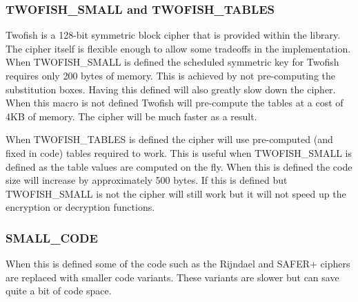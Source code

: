 \documentclass[b5paper]{book}
\begin{document}
\subsubsection{TWOFISH\_SMALL and TWOFISH\_TABLES}
Twofish is a 128-bit symmetric block cipher that is provided within the library.  The cipher itself is flexible enough
to allow some tradeoffs in the implementation.  When TWOFISH\_SMALL is defined the scheduled symmetric key for Twofish 
requires only 200 bytes of memory.  This is achieved by not pre-computing the substitution boxes.  Having this 
defined will also greatly slow down the cipher.  When this macro is not defined Twofish will pre-compute the 
tables at a cost of 4KB of memory.  The cipher will be much faster as a result.  

When TWOFISH\_TABLES is defined the cipher will use pre-computed (and fixed in code) tables required to work.  This is
useful when TWOFISH\_SMALL is defined as the table values are computed on the fly.  When this is defined the code size
will increase by approximately 500 bytes.  If this is defined but TWOFISH\_SMALL is not the cipher will still work but
it will not speed up the encryption or decryption functions.

\subsubsection{SMALL\_CODE}
When this is defined some of the code such as the Rijndael and SAFER+ ciphers are replaced with smaller code variants.
These variants are slower but can save quite a bit of code space.
\end{document}
